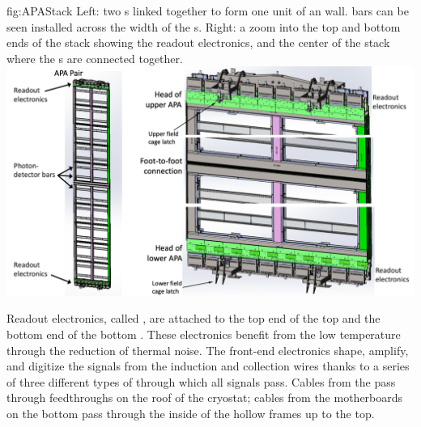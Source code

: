 \begin{dunefigure}{fig:APAStack}
{Left: two s linked together to form one unit of an  wall.  bars can be seen installed across the width of the s. Right: a zoom into the top and bottom ends of the  stack showing the readout electronics, and the center of the stack where the s are connected together.}
\includegraphics[width=\textwidth]{graphics/APAStack.pdf}
\end{dunefigure}

Readout electronics, called , are attached to the top end of the top  and the bottom end of the bottom . These  electronics benefit from the low  temperature through the reduction of thermal noise. The front-end electronics shape, amplify, and digitize the signals from the induction and collection wires thanks to a series of three different types of  through which all signals pass.
Cables from the  pass through feedthroughs on the roof of the cryostat; cables from the motherboards on the bottom  pass through the inside of the hollow  frames up to the top.


